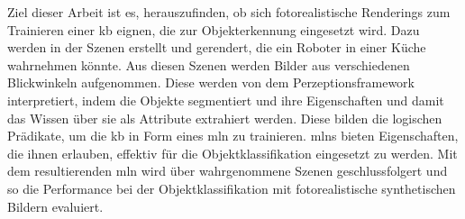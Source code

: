 Ziel dieser Arbeit ist es, herauszufinden, ob sich fotorealistische Renderings zum Trainieren einer \gls{kb} eignen, die zur Objekterkennung eingesetzt wird. Dazu werden in der \unreal Szenen erstellt und gerendert, die ein Roboter in einer Küche wahrnehmen könnte. Aus diesen Szenen werden Bilder aus verschiedenen Blickwinkeln aufgenommen. Diese werden von dem Perzeptionsframework \robosherlock interpretiert, indem die Objekte segmentiert und ihre Eigenschaften und damit das Wissen über sie als Attribute extrahiert werden. Diese bilden die logischen Prädikate, um die \gls{kb} in Form eines \gls{mln} zu trainieren. \glspl{mln} bieten Eigenschaften, die ihnen erlauben, effektiv für die Objektklassifikation eingesetzt zu werden. Mit dem resultierenden \gls{mln} wird über wahrgenommene Szenen geschlussfolgert und so die Performance bei der Objektklassifikation mit fotorealistische synthetischen Bildern evaluiert.       
